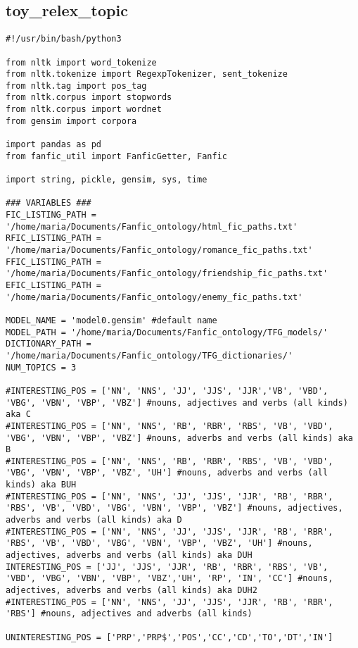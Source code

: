 \documentclass{pre-tfg}
\begin{document}
\subsection{toy\_relex\_topic}
\begin{lstlisting}[style=consola]
#!/usr/bin/bash/python3

from nltk import word_tokenize
from nltk.tokenize import RegexpTokenizer, sent_tokenize
from nltk.tag import pos_tag
from nltk.corpus import stopwords
from nltk.corpus import wordnet
from gensim import corpora

import pandas as pd
from fanfic_util import FanficGetter, Fanfic

import string, pickle, gensim, sys, time

### VARIABLES ###
FIC_LISTING_PATH = '/home/maria/Documents/Fanfic_ontology/html_fic_paths.txt'
RFIC_LISTING_PATH = '/home/maria/Documents/Fanfic_ontology/romance_fic_paths.txt'
FFIC_LISTING_PATH = '/home/maria/Documents/Fanfic_ontology/friendship_fic_paths.txt'
EFIC_LISTING_PATH = '/home/maria/Documents/Fanfic_ontology/enemy_fic_paths.txt'

MODEL_NAME = 'model0.gensim' #default name
MODEL_PATH = '/home/maria/Documents/Fanfic_ontology/TFG_models/'
DICTIONARY_PATH = '/home/maria/Documents/Fanfic_ontology/TFG_dictionaries/'
NUM_TOPICS = 3

#INTERESTING_POS = ['NN', 'NNS', 'JJ', 'JJS', 'JJR','VB', 'VBD', 'VBG', 'VBN', 'VBP', 'VBZ'] #nouns, adjectives and verbs (all kinds) aka C
#INTERESTING_POS = ['NN', 'NNS', 'RB', 'RBR', 'RBS', 'VB', 'VBD', 'VBG', 'VBN', 'VBP', 'VBZ'] #nouns, adverbs and verbs (all kinds) aka B
#INTERESTING_POS = ['NN', 'NNS', 'RB', 'RBR', 'RBS', 'VB', 'VBD', 'VBG', 'VBN', 'VBP', 'VBZ', 'UH'] #nouns, adverbs and verbs (all kinds) aka BUH
#INTERESTING_POS = ['NN', 'NNS', 'JJ', 'JJS', 'JJR', 'RB', 'RBR', 'RBS', 'VB', 'VBD', 'VBG', 'VBN', 'VBP', 'VBZ'] #nouns, adjectives, adverbs and verbs (all kinds) aka D
#INTERESTING_POS = ['NN', 'NNS', 'JJ', 'JJS', 'JJR', 'RB', 'RBR', 'RBS', 'VB', 'VBD', 'VBG', 'VBN', 'VBP', 'VBZ', 'UH'] #nouns, adjectives, adverbs and verbs (all kinds) aka DUH
INTERESTING_POS = ['JJ', 'JJS', 'JJR', 'RB', 'RBR', 'RBS', 'VB', 'VBD', 'VBG', 'VBN', 'VBP', 'VBZ','UH', 'RP', 'IN', 'CC'] #nouns, adjectives, adverbs and verbs (all kinds) aka DUH2
#INTERESTING_POS = ['NN', 'NNS', 'JJ', 'JJS', 'JJR', 'RB', 'RBR', 'RBS'] #nouns, adjectives and adverbs (all kinds)

UNINTERESTING_POS = ['PRP','PRP$','POS','CC','CD','TO','DT','IN']


\end{lstlisting}
\end{document}

